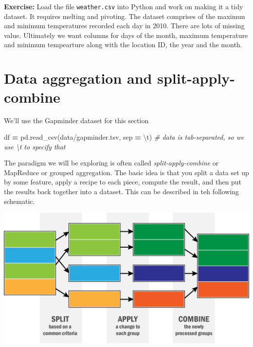 \documentclass[
  letterpaper,
]{scrbook}
\newenvironment{Shaded}{\begin{snugshade}}{\end{snugshade}}
\newcommand{\CharTok}[1]{\textcolor[rgb]{0.31,0.60,0.02}{#1}}
\newcommand{\CommentTok}[1]{\textcolor[rgb]{0.56,0.35,0.01}{\textit{#1}}}
\newcommand{\NormalTok}[1]{#1}
\newcommand{\OperatorTok}[1]{\textcolor[rgb]{0.81,0.36,0.00}{\textbf{#1}}}
\newcommand{\StringTok}[1]{\textcolor[rgb]{0.31,0.60,0.02}{#1}}
\begin{document}
\textbf{Exercise:} Load the file \texttt{weather.csv} into Python and work on making it a tidy dataset. It requires melting and pivoting. The dataset comprises of the maximun and minimum temperatures recorded each day in 2010. There are lots of missing value. Ultimately we want columns for days of the month, maximum temperature and minimum tempearture along with the location ID, the year and the month.

\hypertarget{data-aggregation-and-split-apply-combine}{%
\section{Data aggregation and split-apply-combine}\label{data-aggregation-and-split-apply-combine}}

We'll use the Gapminder dataset for this section

\begin{Shaded}
\begin{Highlighting}[]
\NormalTok{df }\OperatorTok{=}\NormalTok{ pd.read\_csv(}\StringTok{\textquotesingle{}data/gapminder.tsv\textquotesingle{}}\NormalTok{, sep }\OperatorTok{=} \StringTok{\textquotesingle{}}\CharTok{\textbackslash{}t}\StringTok{\textquotesingle{}}\NormalTok{) }\CommentTok{\# data is tab{-}separated, so we use \textasciigrave{}\textbackslash{}t\textasciigrave{} to specify that}
\end{Highlighting}
\end{Shaded}

The paradigm we will be exploring is often called \emph{split-apply-combine} or MapReduce or grouped aggregation. The basic idea is that you split a data set up by some feature, apply a recipe to each piece, compute the result, and then put the results back together into a dataset. This can be described in teh following schematic.

\includegraphics{graphs/split-apply-combine.png}
\end{document}
